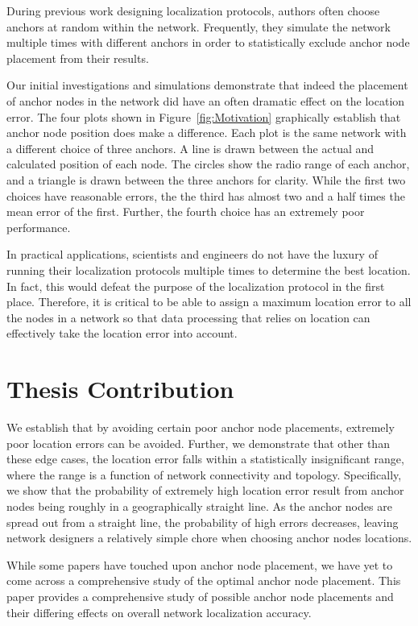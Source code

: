 During previous work designing localization protocols\cite[p. 11]{CCA-MAP09}\cite[p.2 ]{MDS-MAP}, authors often choose anchors at random within the network.  Frequently, they simulate the network multiple times with different anchors in order to statistically exclude anchor node placement from their results. 

Our initial investigations and simulations demonstrate that indeed the placement of anchor nodes in the network did have an often dramatic effect on the location error.  The four plots shown in Figure~\ref{fig:Motivation} graphically establish that anchor node position does make a difference.  Each plot is the same network with a different choice of three anchors.  A line is drawn between the actual and calculated position of each node.  The circles show the radio range of each anchor, and a triangle is drawn between the three anchors for clarity.  While the first two choices have reasonable errors, the the third has almost two and a half times the mean error of the first.  Further, the fourth choice has an extremely poor performance.   

In practical applications, scientists and engineers do not have the luxury of running their localization protocols multiple times to determine the best location.  In fact, this would defeat the purpose of the localization protocol in the first place.  Therefore, it is critical to be able to assign a maximum location error to all the nodes in a network so that data processing that relies on location can effectively take the location error into account.  

\section{Thesis Contribution}
We establish that by avoiding certain poor anchor node placements, extremely poor location errors can be avoided.  Further, we demonstrate that other than these edge cases, the location error falls within a statistically insignificant range, where the range is a function of network connectivity and topology.  Specifically, we show that the probability of extremely high location error result from anchor nodes being roughly in a geographically straight line.  As the anchor nodes are spread out from a straight line, the probability of high errors decreases, leaving network designers a relatively simple chore when choosing anchor nodes locations.

While some papers have touched upon anchor node placement, we have yet to come across a comprehensive study of the optimal anchor node placement.  This paper provides a comprehensive study of possible anchor node placements and their differing effects on overall network localization accuracy.

